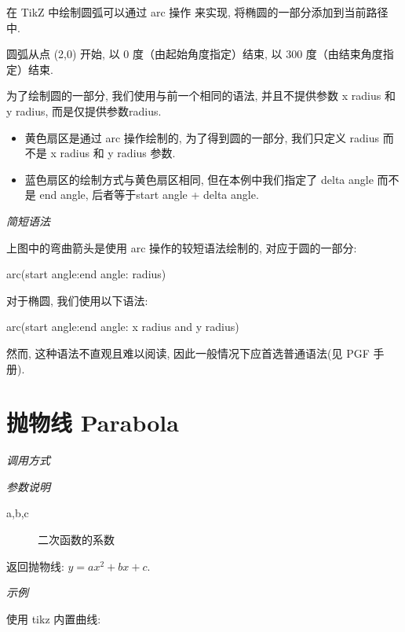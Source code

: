 在 TikZ 中绘制圆弧可以通过 arc 操作 来实现, 将椭圆的一部分添加到当前路径中.


圆弧从点 (2,0) 开始, 以 0 度（由起始角度指定）结束, 以 300 度（由结束角度指定）结束.

为了绘制圆的一部分, 我们使用与前一个相同的语法, 并且不提供参数 x radius 和 y radius, 而是仅提供参数radius.


\begin{itemize}

\item 黄色扇区是通过 arc 操作绘制的, 为了得到圆的一部分, 我们只定义 radius 而不是  x radius 和 y radius 参数. 

\item 蓝色扇区的绘制方式与黄色扇区相同, 但在本例中我们指定了 delta angle 而不是 end angle, 后者等于start angle + delta angle.

\end{itemize}

\emph{简短语法}

上图中的弯曲箭头是使用 arc 操作的较短语法绘制的, 对应于圆的一部分:

arc(start angle:end angle: radius)

对于椭圆, 我们使用以下语法: 

arc(start angle:end angle: x radius and y radius)

然而, 这种语法不直观且难以阅读, 因此一般情况下应首选普通语法(见 PGF 手册).

\section{抛物线 Parabola}

\emph{调用方式}

\begin{tcolorbox}{}
\end{tcolorbox}

\emph{参数说明}

\begin{description}
  \item[a,b,c] 二次函数的系数
\end{description}

返回抛物线: $y=ax^2+bx+c$.

\emph{示例}

使用 tikz 内置曲线:

